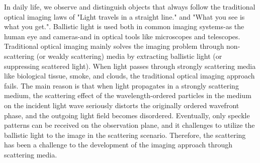 \begin{englishabstract}
In daily life, we observe and distinguish objects that always follow the traditional optical imaging laws of "Light travels in a straight line." and "What you see is what you get.". Ballistic light is used both in common imaging systems-as the human eye and cameras-and in optical tools like microscopes and telescopes. Traditional optical imaging mainly solves the imaging problem through non-scattering (or weakly scattering) media by extracting ballistic light (or suppressing scattered light). When light passes through strongly scattering media like biological tissue, smoke, and clouds, the traditional optical imaging approach fails. The main reason is that when light propagates in a strongly scattering medium, the scattering effect of the wavelength-ordered particles in the medium on the incident light wave seriously distorts the originally ordered wavefront phase, and the outgoing light field becomes disordered. Eventually, only speckle patterns can be received on the observation plane, and it challenges to utilize the ballistic light to the image in the scattering scenario. Therefore, the scattering has been a challenge to the development of the imaging approach through scattering media.


\end{englishabstract}
